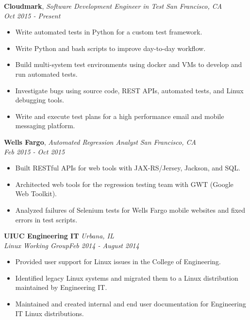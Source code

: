 \documentclass{article}
\newenvironment{changemargin}[2]{%
  \begin{list}{}{%
    \setlength{\topsep}{0pt}%
    \setlength{\leftmargin}{#1}%
    \setlength{\rightmargin}{#2}%
    \setlength{\listparindent}{\parindent}%
    \setlength{\itemindent}{\parindent}%
    \setlength{\parsep}{\parskip}%
  }%
  \item[]}{\end{list}
}
\newenvironment{body} {
	\vspace*{-16pt}
	\begin{changemargin}{-0.25in}{-0.5in}
  }	
	{\end{changemargin}
}
\begin{document}
\begin{body}

	\vspace{20pt}
	\textbf{Cloudmark}, \emph{Software Development Engineer in Test} \hfill \emph{San Francisco, CA}\\
	\hfill \emph{Oct 2015 - Present}\\
	\vspace*{-16pt}
	\begin{itemize} \itemsep -0pt  %
		\item Write automated tests in Python for a custom test framework.
		\item Write Python and bash scripts to improve day-to-day workflow.
		\item Build multi-system test environments using docker and VMs to develop and run automated tests.
		\item Investigate bugs using source code, REST APIs, automated tests, and Linux debugging tools.
		\item Write and execute test plans for a high performance email and mobile messaging platform.
	\end{itemize}
	
	\vspace{14pt}
	\textbf{Wells Fargo}, \emph{Automated Regression Analyst} \hfill \emph{San Francisco, CA}\\
	\hfill \emph{Feb 2015 - Oct 2015}\\
	\vspace*{-16pt}
	\begin{itemize} \itemsep -0pt  %
		\item Built RESTful APIs for web tools with JAX-RS/Jersey, Jackson, and SQL.
		\item Architected web tools for the regression testing team with GWT (Google Web Toolkit).
		\item Analyzed failures of Selenium tests for Wells Fargo mobile websites and fixed errors in test scripts.		
	\end{itemize}



	\vspace{14pt}
	\textbf{UIUC Engineering IT} \hfill \emph{Urbana, IL}\\
	\emph{Linux Working Group}\hfill \emph{Feb 2014 - August 2014}\\

	\begin{itemize} \itemsep -0pt  %
		\item Provided user support for Linux issues in the College of Engineering.
		\item Identified legacy Linux systems and migrated them to a Linux distribution maintained by Engineering IT.
		\item Maintained and created internal and end user documentation for Engineering IT Linux distributions.
	\end{itemize}


\end{body}
\end{document}
